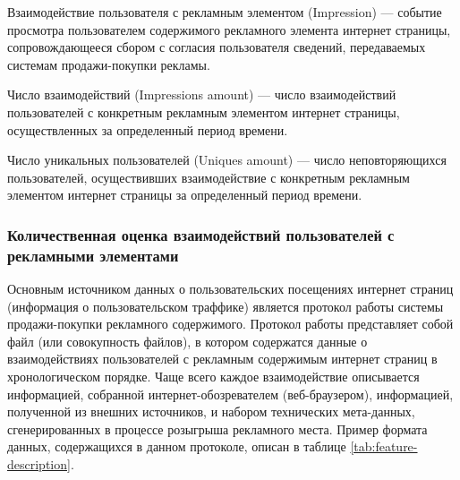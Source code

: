 Взаимодействие пользователя с рекламным элементом (Impression) --- событие просмотра пользователем содержимого
рекламного элемента интернет страницы, сопровождающееся сбором с согласия пользователя сведений, передаваемых 
системам продажи-покупки рекламы.

Число взаимодействий (Impressions amount) --- число взаимодействий пользователей с конкретным рекламным элементом
интернет страницы, осуществленных за определенный период времени.

Число уникальных пользователей (Uniques amount) --- число неповторяющихся пользователей, осуществивших взаимодействие
с конкретным рекламным элементом интернет страницы за определенный период времени.

\subsubsection{Количественная оценка взаимодействий пользователей с рекламными элементами}

Основным источником данных о пользовательских посещениях интернет страниц (информация о пользовательском траффике)
является протокол работы системы продажи-покупки рекламного содержимого. Протокол работы представляет собой файл 
(или совокупность файлов), в котором содержатся данные о взаимодействиях пользователей с рекламным содержимым 
интернет страниц в хронологическом порядке. Чаще всего каждое взаимодействие описывается информацией, собранной 
интернет-обозревателем (веб-браузером), информацией, полученной из внешних источников, и набором технических мета-данных,
сгенерированных в процессе розыгрыша рекламного места. Пример формата данных, содержащихся в данном протоколе, 
описан в таблице \ref{tab:feature-description}.

